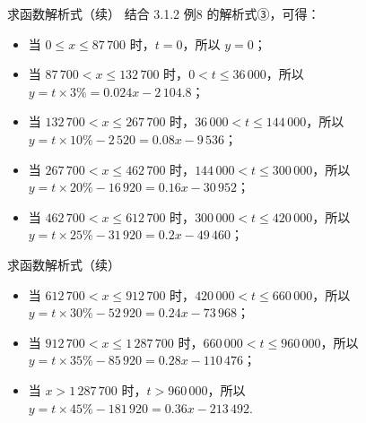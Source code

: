\documentclass[aspectratio=169,13pt,t] {beamer}
\theoremstyle{definition}
\begin{document}
\begin{frame}{求函数解析式（续）}
	结合 3.1.2 例8 的解析式③，可得：
	\small
	\begin{itemize}
		\item 当 \(0 \leqslant x \leqslant 87\,700\) 时，\(t=0\)，所以 \(y=0\)；
		\item 当 \(87\,700 < x \leqslant 132\,700\) 时，\(0 < t \leqslant 36\,000\)，所以 \\ \(y = t \times 3\% = 0.024x - 2\,104.8\)；
		\item 当 \(132\,700 < x \leqslant 267\,700\) 时，\(36\,000 < t \leqslant 144\,000\)，所以 \\ \(y = t \times 10\% - 2\,520 = 0.08x - 9\,536\)；
		\item 当 \(267\,700 < x \leqslant 462\,700\) 时，\(144\,000 < t \leqslant 300\,000\)，所以 \\ \(y = t \times 20\% - 16\,920 = 0.16x - 30\,952\)；
		\item 当 \(462\,700 < x \leqslant 612\,700\) 时，\(300\,000 < t \leqslant 420\,000\)，所以 \\ \(y = t \times 25\% - 31\,920 = 0.2x - 49\,460\)；
	\end{itemize}
\end{frame}

\begin{frame}{求函数解析式（续）}
	\small
	\begin{itemize}
		\item 当 \(612\,700 < x \leqslant 912\,700\) 时，\(420\,000 < t \leqslant 660\,000\)，所以 \\ \(y = t \times 30\% - 52\,920 = 0.24x - 73\,968\)；
		\item 当 \(912\,700 < x \leqslant 1\,287\,700\) 时，\(660\,000 < t \leqslant 960\,000\)，所以 \\ \(y = t \times 35\% - 85\,920 = 0.28x - 110\,476\)；
		\item 当 \(x > 1\,287\,700\) 时，\(t > 960\,000\)，所以 \\ \(y = t \times 45\% - 181\,920 = 0.36x - 213\,492\).
	\end{itemize}
	
	
\end{frame}
\end{document}
